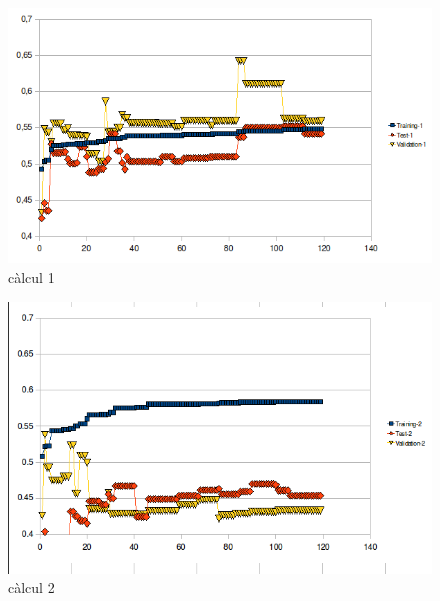 \documentclass[titlepage,a4paper,12pt]{book}
\begin{document}
\begin{figure}[h] \begin{center}
\includegraphics[scale=0.75]{pholus/pholus1.png}
\end{center}
\caption{càlcul 1}
\label{fig:pholusResult1}
\end{figure}

\begin{figure}[h]
\begin{center}
\includegraphics[scale=0.75]{pholus/pholus2.png}
\end{center}
\caption{càlcul 2}
\label{fig:pholusResult2}
\end{figure}
\end{document}
